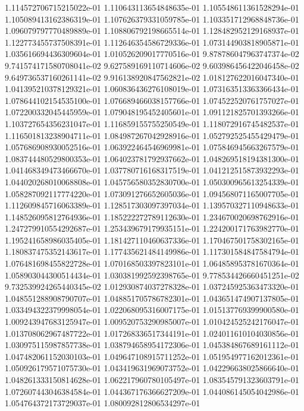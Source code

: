 1.114572706715215022e-01
1.110643113654848635e-01
1.105548611361528294e-01
1.105089413162386319e-01
1.107626379331059785e-01
1.103351712968848736e-01
1.096079797770489889e-01
1.108806792198665514e-01
1.128482952129168937e-01
1.122773455737508391e-01
1.112646354586729336e-01
1.073144903818905871e-01
1.035616694436309604e-01
1.010526209017770516e-01
9.878786047963747374e-02
9.741574171580708041e-02
9.627589169110714606e-02
9.603986456422046458e-02
9.649736537160261141e-02
9.916138920847562821e-02
1.018127622016047340e-01
1.041395210378129321e-01
1.060836436276108019e-01
1.073163513363366434e-01
1.078644102154535100e-01
1.076689466038157766e-01
1.074522520761757027e-01
1.072200332045445959e-01
1.079048195452405601e-01
1.091121825701393266e-01
1.103727654356231047e-01
1.116859155755250549e-01
1.118072916745482537e-01
1.116501813238904711e-01
1.084987267042928916e-01
1.052792525455429479e-01
1.057686908930052516e-01
1.063922464546969981e-01
1.075846945663267579e-01
1.083744480529800353e-01
1.064023781792937662e-01
1.048269518194381300e-01
1.041468349473466670e-01
1.037780716168317519e-01
1.041212515873932293e-01
1.044020268010068808e-01
1.045756580352830700e-01
1.050300965613254339e-01
1.058287092117774220e-01
1.073091276652605036e-01
1.094568071165007705e-01
1.112609845716063389e-01
1.128517303097397034e-01
1.139570327110948633e-01
1.148526095812764936e-01
1.185222272789112630e-01
1.234670020698762916e-01
1.247279910554292687e-01
1.253439679179935151e-01
1.224200171763982770e-01
1.195241658986035405e-01
1.181427110460637336e-01
1.170467501758302165e-01
1.180837475352143617e-01
1.177435621484149986e-01
1.117301584847584794e-01
1.076481698455822728e-01
1.070168503397823101e-01
1.064858953781670364e-01
1.058903044300514434e-01
1.030381992592398765e-01
9.778534426660451251e-02
9.732539924265440345e-02
1.012930874037278328e-01
1.037245925363473320e-01
1.048551288908790707e-01
1.048851705786782301e-01
1.043651474907137805e-01
1.033494322379998054e-01
1.022068095316007175e-01
1.015137769399900580e-01
1.009243947683125947e-01
1.009520753290985007e-01
1.010424525242176047e-01
1.013708062967487722e-01
1.017268336517344191e-01
1.024011610104030856e-01
1.030975115987857738e-01
1.038794658954172306e-01
1.045384867689161112e-01
1.047482061152030103e-01
1.049647108915711252e-01
1.051954977162012361e-01
1.050926179571075730e-01
1.043419631969073752e-01
1.042296638025866640e-01
1.048261333150814628e-01
1.062217960780105497e-01
1.083545791323603791e-01
1.072607443046384584e-01
1.044367176366627209e-01
1.044086145054042986e-01
1.054764372173729037e-01
1.080092812806534297e-01
